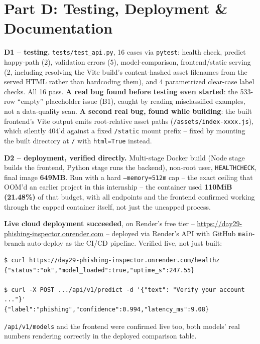 \documentclass[11pt,a4paper]{article}
\begin{document}
\section*{Part D: Testing, Deployment \& Documentation}

\textbf{D1 -- testing.} \texttt{tests/test\_api.py}, 16 cases via \texttt{pytest}: health
check, predict happy-path (2), validation errors (5), model-comparison, frontend/static
serving (2, including resolving the Vite build's content-hashed asset filenames from the
served HTML rather than hardcoding them), and 4 parametrized clear-case label checks. All 16
pass. \textbf{A real bug found before testing even started}: the 533-row ``empty''
placeholder issue (B1), caught by reading misclassified examples, not a data-quality scan.
\textbf{A second real bug, found while building}: the built frontend's Vite output emits
root-relative asset paths (\texttt{/assets/index-xxxx.js}), which silently 404'd against a
fixed \texttt{/static} mount prefix -- fixed by mounting the built directory at \texttt{/}
with \texttt{html=True} instead.

\textbf{D2 -- deployment, verified directly.} Multi-stage Docker build (Node stage builds
the frontend, Python stage runs the backend), non-root user, \texttt{HEALTHCHECK}, final
image \textbf{649MB}. Run with a hard \texttt{--memory=512m} cap -- the exact ceiling that
OOM'd an earlier project in this internship -- the container used \textbf{110MiB (21.48\%)}
of that budget, with all endpoints and the frontend confirmed working through the capped
container itself, not just the uncapped process.

\begin{sloppypar}
\textbf{Live cloud deployment succeeded}, on Render's free tier --
\url{https://day29-phishing-inspector.onrender.com} -- deployed via Render's API with
GitHub \texttt{main}-branch auto-deploy as the CI/CD pipeline. Verified live, not just
built:
\end{sloppypar}

\begin{verbatim}
$ curl https://day29-phishing-inspector.onrender.com/healthz
{"status":"ok","model_loaded":true,"uptime_s":247.55}

$ curl -X POST .../api/v1/predict -d '{"text": "Verify your account ..."}'
{"label":"phishing","confidence":0.994,"latency_ms":9.08}
\end{verbatim}

\texttt{/api/v1/models} and the frontend were confirmed live too, both models' real numbers
rendering correctly in the deployed comparison table.
\end{document}
